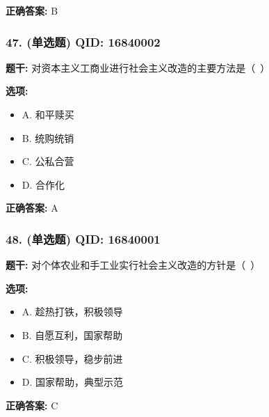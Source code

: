 \documentclass[12pt,UTF8]{ctexart}
\begin{document}
\textbf{正确答案:}
B

\vspace{0.3em}\hrulefill\vspace{0.7em}

\subsubsection*{47. (单选题) \small QID: 16840002}

\textbf{题干:}
对资本主义工商业进行社会主义改造的主要方法是（ ）

\textbf{选项:}
\begin{itemize}[leftmargin=*]

  \item A. 和平赎买

  \item B. 统购统销

  \item C. 公私合营

  \item D. 合作化

\end{itemize}

\textbf{正确答案:}
A

\vspace{0.3em}\hrulefill\vspace{0.7em}

\subsubsection*{48. (单选题) \small QID: 16840001}

\textbf{题干:}
对个体农业和手工业实行社会主义改造的方针是（ ）

\textbf{选项:}
\begin{itemize}[leftmargin=*]

  \item A. 趁热打铁，积极领导

  \item B. 自愿互利，国家帮助

  \item C. 积极领导，稳步前进

  \item D. 国家帮助，典型示范

\end{itemize}

\textbf{正确答案:}
C

\vspace{0.3em}\hrulefill\vspace{0.7em}
\end{document}
